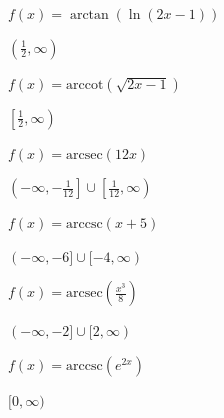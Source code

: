 \documentclass{ximera}
\begin{document}
\begin{question}
\begin{problem}
$f(x) =\arctan(\ln(2x-1))$

\begin{solution}
$\left(\frac{1}{2}, \infty \right)$
\end{solution}
\end{problem}

\begin{problem}
$f(x) = \text{arccot}(\sqrt{2x-1})$

\begin{solution}
$\left[\frac{1}{2}, \infty \right)$
\end{solution}
\end{problem}

\begin{problem}
$f(x) = \text{arcsec}(12x)$

\begin{solution}
$\left(-\infty, -\frac{1}{12}\right] \cup \left[\frac{1}{12}, \infty\right)$
\end{solution}
\end{problem}

\begin{problem}
$f(x) = \text{arccsc}(x+5)$

\begin{solution}
$(-\infty, -6] \cup [-4, \infty)$
\end{solution}
\end{problem}

\begin{problem}
$f(x) = \text{arcsec}\left(\frac{x^3}{8}\right)$

\begin{solution}
$(-\infty, -2] \cup [2, \infty)$
\end{solution}
\end{problem}

\begin{problem} \label{domainexerlast}
$f(x) = \text{arccsc}\left(e^{2x}\right)$ 

\begin{solution}
$[0, \infty)$
\end{solution}
\end{problem}

\end{question}
\end{document}
